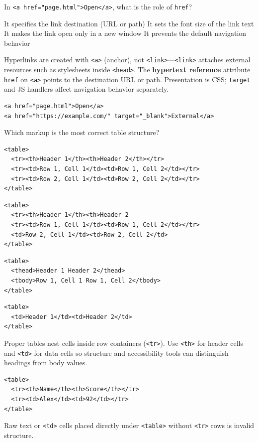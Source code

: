 \question[4]
In \texttt{<a href="page.html">Open</a>}, what is the role of \texttt{href}?
\begin{choices}
  \CorrectChoice It specifies the link destination (URL or path)
  \choice It sets the font size of the link text
  \choice It makes the link open only in a new window
  \choice It prevents the default navigation behavior
\end{choices}
\begin{solution}
  Hyperlinks are created with \texttt{<a>} (anchor), not \texttt{<link>}---\texttt{<link>} attaches external resources such as stylesheets inside \texttt{<head>}. The \textbf{hypertext reference} attribute \texttt{href} on \texttt{<a>} points to the destination URL or path. Presentation is CSS; \texttt{target} and JS handlers affect navigation behavior separately.
\begin{lstlisting}[style=htmlinline]
<a href="page.html">Open</a>
<a href="https://example.com/" target="_blank">External</a>
\end{lstlisting}
\end{solution}

\question[4]
Which markup is the most correct table structure?
\begin{choices}
  \CorrectChoice
\begin{lstlisting}[style=htmlinline]
<table>
  <tr><th>Header 1</th><th>Header 2</th></tr>
  <tr><td>Row 1, Cell 1</td><td>Row 1, Cell 2</td></tr>
  <tr><td>Row 2, Cell 1</td><td>Row 2, Cell 2</td></tr>
</table>
\end{lstlisting}
  \choice
\begin{lstlisting}[style=htmlinline]
<table>
  <tr><th>Header 1</th><th>Header 2
  <tr><td>Row 1, Cell 1</td><td>Row 1, Cell 2</td></tr>
  <td>Row 2, Cell 1</td><td>Row 2, Cell 2</td>
</table>
\end{lstlisting}
  \choice
\begin{lstlisting}[style=htmlinline]
<table>
  <thead>Header 1 Header 2</thead>
  <tbody>Row 1, Cell 1 Row 1, Cell 2</tbody>
</table>
\end{lstlisting}
  \choice
\begin{lstlisting}[style=htmlinline]
<table>
  <td>Header 1</td><td>Header 2</td>
</table>
\end{lstlisting}
\end{choices}
\begin{solution}
  Proper tables nest cells inside row containers (\texttt{<tr>}). Use \texttt{<th>} for header cells and \texttt{<td>} for data cells so structure and accessibility tools can distinguish headings from body values.
\begin{lstlisting}[style=htmlinline]
<table>
  <tr><th>Name</th><th>Score</th></tr>
  <tr><td>Alex</td><td>92</td></tr>
</table>
\end{lstlisting}
  Raw text or \texttt{<td>} cells placed directly under \texttt{<table>} without \texttt{<tr>} rows is invalid structure.
\end{solution}

